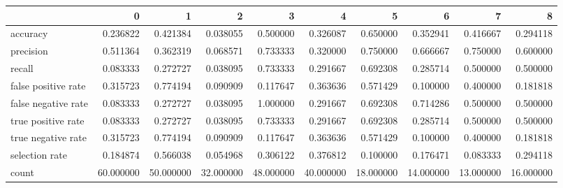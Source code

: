 \begin{tabular}{lrrrrrrrrr}
\toprule
{} &          0 &          1 &          2 &          3 &          4 &          5 &          6 &          7 &          8 \\
\midrule
accuracy            &   0.236822 &   0.421384 &   0.038055 &   0.500000 &   0.326087 &   0.650000 &   0.352941 &   0.416667 &   0.294118 \\
precision           &   0.511364 &   0.362319 &   0.068571 &   0.733333 &   0.320000 &   0.750000 &   0.666667 &   0.750000 &   0.600000 \\
recall              &   0.083333 &   0.272727 &   0.038095 &   0.733333 &   0.291667 &   0.692308 &   0.285714 &   0.500000 &   0.500000 \\
false positive rate &   0.315723 &   0.774194 &   0.090909 &   0.117647 &   0.363636 &   0.571429 &   0.100000 &   0.400000 &   0.181818 \\
false negative rate &   0.083333 &   0.272727 &   0.038095 &   1.000000 &   0.291667 &   0.692308 &   0.714286 &   0.500000 &   0.500000 \\
true positive rate  &   0.083333 &   0.272727 &   0.038095 &   0.733333 &   0.291667 &   0.692308 &   0.285714 &   0.500000 &   0.500000 \\
true negative rate  &   0.315723 &   0.774194 &   0.090909 &   0.117647 &   0.363636 &   0.571429 &   0.100000 &   0.400000 &   0.181818 \\
selection rate      &   0.184874 &   0.566038 &   0.054968 &   0.306122 &   0.376812 &   0.100000 &   0.176471 &   0.083333 &   0.294118 \\
count               &  60.000000 &  50.000000 &  32.000000 &  48.000000 &  40.000000 &  18.000000 &  14.000000 &  13.000000 &  16.000000 \\
\bottomrule
\end{tabular}

